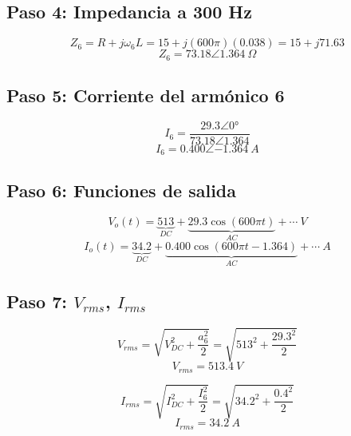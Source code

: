 \documentclass[12pt]{article}
\begin{document}
\subsection*{Paso 4: Impedancia a 300 Hz}
\begin{equation}
Z_6=R+j\omega_6L=15+j(600\pi)(0.038)=15+j71.63
\end{equation}
\begin{equation}
\boxed{Z_6=73.18\angle1.364\ \Omega}
\end{equation}

\subsection*{Paso 5: Corriente del armónico 6}
\begin{equation}
I_6=\frac{29.3\angle0°}{73.18\angle1.364}
\end{equation}
\begin{equation}
\boxed{I_6=0.400\angle{-1.364}\ A}
\end{equation}

\subsection*{Paso 6: Funciones de salida}
\begin{equation}
V_o(t)=\underbrace{513}_{DC}+\underbrace{29.3\cos(600\pi t)}_{AC}+\cdots\ V
\end{equation}
\begin{equation}
I_o(t)=\underbrace{34.2}_{DC}+\underbrace{0.400\cos(600\pi t-1.364)}_{AC}+\cdots\ A
\end{equation}

\subsection*{Paso 7: $V_{rms}$, $I_{rms}$}
\begin{equation}
V_{rms}=\sqrt{V_{DC}^2+\frac{a_6^2}{2}}=\sqrt{513^2+\frac{29.3^2}{2}}
\end{equation}
\begin{equation}
\boxed{V_{rms}=513.4\ V}
\end{equation}

\begin{equation}
I_{rms}=\sqrt{I_{DC}^2+\frac{I_6^2}{2}}=\sqrt{34.2^2+\frac{0.4^2}{2}}
\end{equation}
\begin{equation}
\boxed{I_{rms}=34.2\ A}
\end{equation}
\end{document}
